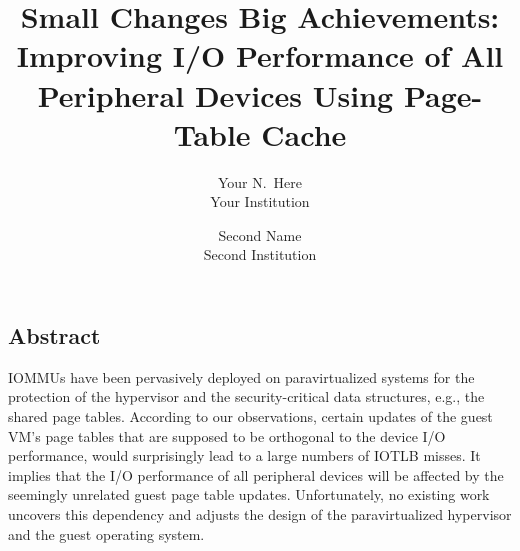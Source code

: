 \documentclass[letterpaper,twocolumn,10pt]{article}
\begin{document}
\newcommand{\name}{IOSUP\xspace}
\newcommand{\eat}[1]{}  %
\newcommand{\authcomment}[3]{\textcolor{#3}{#1 says: #2}}\newcommand{\yueqiang}[1]{\authcomment{Yueqiang}{#1}{red}}
\newcommand{\zhi}[1]{\authcomment{Zhi}{#1}{red}}



\date{}

\title{\Large \bf Small Changes Big Achievements: Improving I/O Performance of All Peripheral Devices Using Page-Table Cache}

\author{
{\rm Your N.\ Here}\\
Your Institution
\and
{\rm Second Name}\\
Second Institution
} %

\maketitle

\thispagestyle{empty}


\subsection*{Abstract}

IOMMUs have been pervasively deployed on paravirtualized systems for the protection of the hypervisor and the security-critical data structures, e.g., the shared page tables. According to our observations, certain updates of the guest VM's page tables that are supposed to be orthogonal to the device I/O performance, would surprisingly lead to a large numbers of IOTLB misses. It implies that the I/O performance of all peripheral devices will be affected by the seemingly unrelated guest page table updates. Unfortunately, no existing work uncovers this dependency and adjusts the design of the paravirtualized hypervisor and the guest operating system.
\end{document}
